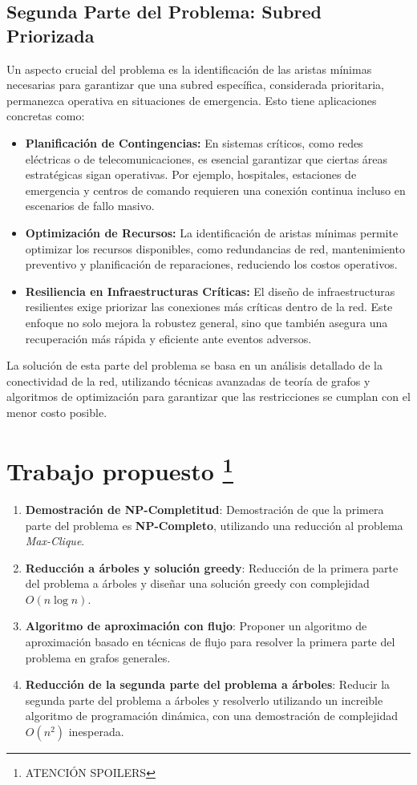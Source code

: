 \subsection*{Segunda Parte del Problema: Subred Priorizada}
Un aspecto crucial del problema es la identificación de las aristas mínimas necesarias para garantizar que una subred específica, considerada prioritaria, permanezca operativa en situaciones de emergencia. Esto tiene aplicaciones concretas como:
\begin{itemize}
    \item \textbf{Planificación de Contingencias:} En sistemas críticos, como redes eléctricas o de telecomunicaciones, es esencial garantizar que ciertas áreas estratégicas sigan operativas. Por ejemplo, hospitales, estaciones de emergencia y centros de comando requieren una conexión continua incluso en escenarios de fallo masivo.
    \item \textbf{Optimización de Recursos:} La identificación de aristas mínimas permite optimizar los recursos disponibles, como redundancias de red, mantenimiento preventivo y planificación de reparaciones, reduciendo los costos operativos.
    \item \textbf{Resiliencia en Infraestructuras Críticas:} El diseño de infraestructuras resilientes exige priorizar las conexiones más críticas dentro de la red. Este enfoque no solo mejora la robustez general, sino que también asegura una recuperación más rápida y eficiente ante eventos adversos.
\end{itemize}

La solución de esta parte del problema se basa en un análisis detallado de la conectividad de la red, utilizando técnicas avanzadas de teoría de grafos y algoritmos de optimización para garantizar que las restricciones se cumplan con el menor costo posible.


\section*{Trabajo propuesto \footnote{ATENCIÓN SPOILERS}}
\begin{enumerate}
    \item \textbf{Demostración de NP-Completitud}: 
    Demostración de que la primera parte del problema es \textbf{NP-Completo}, utilizando una reducción al problema \textit{Max-Clique}.
    \item \textbf{Reducción a árboles y solución greedy}: 
    Reducción de la primera parte del problema a árboles y diseñar una solución greedy con complejidad \( O(n \log n) \).
    \item \textbf{Algoritmo de aproximación con flujo}: 
    Proponer un algoritmo de aproximación basado en técnicas de flujo para resolver la primera parte del problema en grafos generales.
    \item \textbf{Reducción de la segunda parte del problema a árboles}: 
    Reducir la segunda parte del problema a árboles y resolverlo utilizando un increible algoritmo de programación dinámica, con una demostración de complejidad \( O(n^2) \) inesperada.
\end{enumerate}


% 